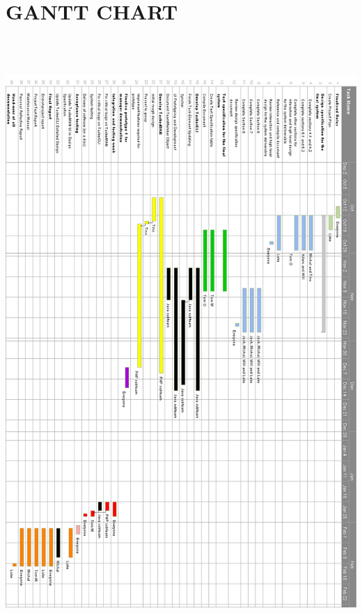 \documentclass{project}
\begin{document}
\section{GANTT CHART}
\begin{center}
\includegraphics[width = 17cm, height = 23cm]{Ganttchart}
\end{center}
\newpage
\end{document}
